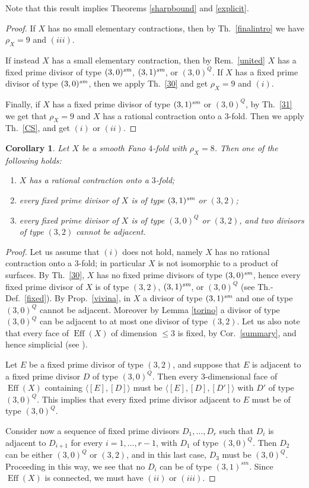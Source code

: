 \documentclass[a4paper,12pt]{amsart}
\newtheorem{corollary}[thm]{Corollary}
\theoremstyle{definition}
\numberwithin{figure}{section}
\numberwithin{table}{section}
\newcommand{\Eff}{\operatorname{Eff}}
\newcommand{\sm}{\text{\it sm}}
\begin{document}
  Note that  this result implies
Theorems \ref{sharpbound} and \ref{explicit}.
\begin{proof}  
  If $X$ has no small elementary contractions, then by Th.~\ref{finalintro} we have $\rho_X=9$ and $(iii)$.
  
  If instead $X$ has a small elementary contraction, then 
 by Rem.~\ref{united} $X$ has a fixed prime divisor of type $(3,0)^{\sm}$, 
$(3,1)^{\sm}$, or $(3,0)^Q$.
If $X$ has a fixed prime divisor of type $(3,0)^{\sm}$, then we apply Th.~\ref{30} and get $\rho_X= 9$ and $(i)$.

 Finally, if $X$ has a fixed prime divisor of type $(3,1)^{\sm}$ or $(3,0)^Q$, by Th.~\ref{31} we get that $\rho_X=9$ and $X$ has a rational contraction onto a $3$-fold. Then we apply Th.~\ref{CS}, and get $(i)$ or $(ii)$.
\end{proof}
 \begin{corollary}\label{last}
          Let $X$ be a smooth Fano $4$-fold with $\rho_X=8$. Then one of the following holds:
          \begin{enumerate}[$(i)$]
          \item $X$ has a rational contraction onto a $3$-fold;
          \item every fixed prime divisor of $X$ is of type $(3,1)^{\sm}$ or $(3,2)$;
            \item every fixed prime divisor of $X$ is of type $(3,0)^Q$ or $(3,2)$, and two divisors of type $(3,2)$ cannot be adjacent.
\end{enumerate}
\end{corollary}
\begin{proof}
  Let us assume that $(i)$ does not hold, namely $X$ has no rational contraction onto a $3$-fold; in particular $X$ is not isomorphic to a product of surfaces.
By Th.~\ref{30}, 
$X$ has no fixed prime divisors of type $(3,0)^{\sm}$, hence
every fixed prime divisor of $X$ is of type $(3,2)$, $(3,1)^{\sm}$, or $(3,0)^Q$
(see Th.-Def.~\ref{fixed}).  By Prop.~\ref{vivina}, in $X$ a divisor of type $(3,1)^{\sm}$ and one of type $(3,0)^Q$ cannot be adjacent. Moreover by Lemma \ref{torino} a divisor of type $(3,0)^Q$ can be adjacent to at most one divisor of type $(3,2)$. Let us also note that every face of $\Eff(X)$ of dimension $\leq 3$ is fixed, by Cor.~\ref{summary}, and hence simplicial (see \cite[Lemma 4.2]{small}).

Let $E$ be a fixed prime divisor of type $(3,2)$, and suppose that $E$ is adjacent to a fixed prime divisor $D$ of type $(3,0)^Q$. Then
every $3$-dimensional face of $\Eff(X)$ containing $\langle [E],[D]\rangle$ must be $\langle  [E],[D],[D']\rangle$ with $D'$ of type $(3,0)^Q$. This implies that every fixed prime divisor adjacent to $E$ must be of type $(3,0)^Q$.

Consider now a sequence of fixed prime divisors $D_1,\dotsc,D_r$ such that $D_i$ is adjacent to $D_{i+1}$ for every $i=1,\dotsc,r-1$,  with $D_1$ of type $(3,0)^{Q}$. Then $D_2$ can be either $(3,0)^Q$ or $(3,2)$, and in this last case, $D_3$ must be $(3,0)^Q$. Proceeding in this way, we see that no $D_i$ can be of type $(3,1)^{sm}$. Since $\Eff(X)$ is connected, we must have $(ii)$ or $(iii)$.
  \end{proof}       
\end{document}

